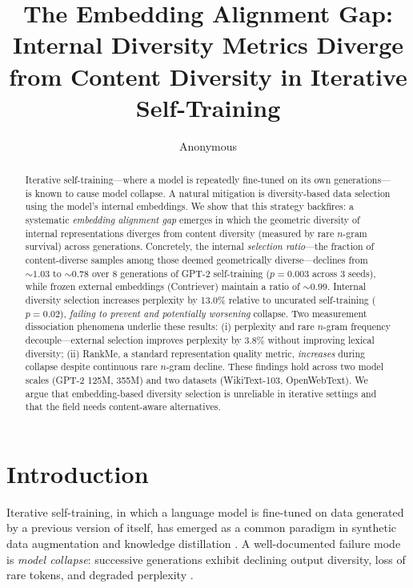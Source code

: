 \documentclass[11pt,a4paper]{article}
\title{The Embedding Alignment Gap: Internal Diversity Metrics Diverge\\from Content Diversity in Iterative Self-Training}
\author{Anonymous}
\begin{document}
\maketitle

\begin{abstract}
Iterative self-training---where a model is repeatedly fine-tuned on its own generations---is known to cause model collapse.
A natural mitigation is diversity-based data selection using the model's internal embeddings.
We show that this strategy backfires: a systematic \emph{embedding alignment gap} emerges in which the geometric diversity of internal representations diverges from content diversity (measured by rare $n$-gram survival) across generations.
Concretely, the internal \emph{selection ratio}---the fraction of content-diverse samples among those deemed geometrically diverse---declines from ${\sim}1.03$ to ${\sim}0.78$ over 8 generations of GPT-2 self-training ($p{=}0.003$ across 3 seeds), while frozen external embeddings (Contriever) maintain a ratio of ${\sim}0.99$.
Internal diversity selection increases perplexity by 13.0\% relative to uncurated self-training ($p{=}0.02$), \emph{failing to prevent and potentially worsening} collapse.
Two measurement dissociation phenomena underlie these results: (i) perplexity and rare $n$-gram frequency decouple---external selection improves perplexity by 3.8\% without improving lexical diversity; (ii) RankMe, a standard representation quality metric, \emph{increases} during collapse despite continuous rare $n$-gram decline.
These findings hold across two model scales (GPT-2 125M, 355M) and two datasets (WikiText-103, OpenWebText).
We argue that embedding-based diversity selection is unreliable in iterative settings and that the field needs content-aware alternatives.
\end{abstract}

\section{Introduction}

Iterative self-training, in which a language model is fine-tuned on data generated by a previous version of itself, has emerged as a common paradigm in synthetic data augmentation and knowledge distillation \cite{shumailov2024model,alemohammad2024selfconsuming}.
A well-documented failure mode is \emph{model collapse}: successive generations exhibit declining output diversity, loss of rare tokens, and degraded perplexity \cite{dohmatob2024tale}.
\end{document}

